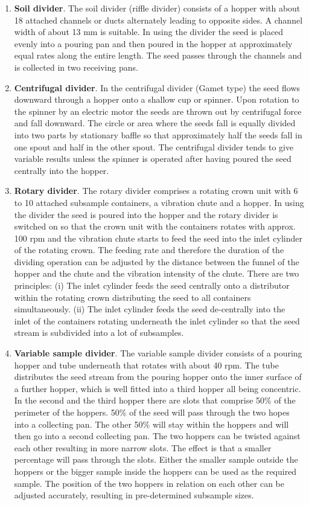 \documentclass[
]{book}
\begin{document}
\begin{enumerate}
\def\labelenumi{\alph{enumi}.}
\setcounter{enumi}{1}
\item
  \textbf{Soil divider}. The soil divider (riffle divider) consists of a hopper with about 18 attached channels or ducts alternately leading to opposite sides. A channel width of about 13 mm is suitable.
  In using the divider the seed is placed evenly into a pouring pan and then poured in the hopper at approximately equal rates along the entire length. The seed passes through the channels and is collected in two receiving pans.
\item
  \textbf{Centrifugal divider}. In the centrifugal divider (Gamet type) the seed flows downward through a hopper onto a shallow cup or spinner. Upon rotation to the spinner by an electric motor the seeds are thrown out by centrifugal force and fall downward. The circle or area where the seeds fall is equally divided into two parts by stationary baffle so that approximately half the seeds fall in one spout and half in the other spout. The centrifugal divider tends to give variable results unless the spinner is operated after having poured the seed centrally into the hopper.
\item
  \textbf{Rotary divider}. The rotary divider comprises a rotating crown unit with 6 to 10 attached subsample containers, a vibration chute and a hopper. In using the divider the seed is poured into the hopper and the rotary divider is switched on so that the crown unit with the containers rotates with approx. 100 rpm and the vibration chute starts to feed the seed into the inlet cylinder of the rotating crown. The feeding rate and therefore the duration of the dividing operation can be adjusted by the distance between the funnel of the hopper and the chute and the vibration intensity of the chute. There are two principles: (i) The inlet cylinder feeds the seed centrally onto a distributor within the rotating crown distributing the seed to all containers simultaneously. (ii) The inlet cylinder feeds the seed de-centrally into the inlet of the containers rotating underneath the inlet cylinder so that the seed stream is subdivided into a lot of subsamples.
\item
  \textbf{Variable sample divider}. The variable sample divider consists of a pouring hopper and tube underneath that rotates with about 40 rpm. The tube distributes the seed stream from the pouring hopper onto the inner surface of a further hopper, which is well fitted into a third hopper all being concentric. In the second and the third hopper there are slots that comprise 50\% of the perimeter of the hoppers. 50\% of the seed will pass through the two hopes into a collecting pan. The other 50\% will stay within the hoppers and will then go into a second collecting pan. The two hoppers can be twisted against each other resulting in more narrow slots. The effect is that a smaller percentage will pass through the slots. Either the smaller sample outside the hoppers or the bigger sample inside the hoppers can be used as the required sample. The position of the two hoppers in relation on each other can be adjusted accurately, resulting in pre-determined subsample sizes.
\end{enumerate}
\end{document}
